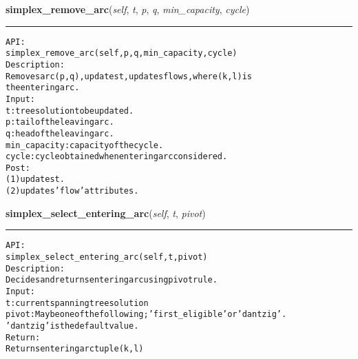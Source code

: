     \label{coinor:gimpy:graph:Graph:simplex_remove_arc}

    \vspace{0.5ex}

\hspace{.8\funcindent}\begin{boxedminipage}{\funcwidth}

    \raggedright \textbf{simplex\_remove\_arc}(\textit{self}, \textit{t}, \textit{p}, \textit{q}, \textit{min\_capacity}, \textit{cycle})

    \vspace{-1.5ex}

    \rule{\textwidth}{0.5\fboxrule}
\setlength{\parskip}{2ex}
\begin{alltt}

API:
    simplex\_remove\_arc(self, p, q, min\_capacity, cycle)
Description:
    Removes arc (p,q), updates t, updates flows, where (k,l) is
    the entering arc.
Input:
    t: tree solution to be updated.
    p: tail of the leaving arc.
    q: head of the leaving arc.
    min\_capacity: capacity of the cycle.
    cycle: cycle obtained when entering arc considered.
Post:
    (1) updates t.
    (2) updates 'flow' attributes.
\end{alltt}

\setlength{\parskip}{1ex}
    \end{boxedminipage}

    \label{coinor:gimpy:graph:Graph:simplex_select_entering_arc}

    \vspace{0.5ex}

\hspace{.8\funcindent}\begin{boxedminipage}{\funcwidth}

    \raggedright \textbf{simplex\_select\_entering\_arc}(\textit{self}, \textit{t}, \textit{pivot})

    \vspace{-1.5ex}

    \rule{\textwidth}{0.5\fboxrule}
\setlength{\parskip}{2ex}
\begin{alltt}

API:
    simplex\_select\_entering\_arc(self, t, pivot)
Description:
    Decides and returns entering arc using pivot rule.
Input:
    t: current spanning tree solution
    pivot: May be one of the following; 'first\_eligible' or 'dantzig'.
    'dantzig' is the default value.
Return:
    Returns entering arc tuple (k,l)
\end{alltt}

\setlength{\parskip}{1ex}
    \end{boxedminipage}

